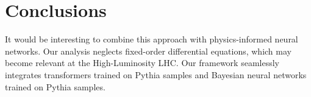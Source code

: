 \section{Conclusions}\label{sec:conclusions}

It would be interesting to combine this approach with physics-informed
neural networks. Our analysis neglects fixed-order differential
equations, which may become relevant at the High-Luminosity LHC. Our
framework seamlessly integrates transformers trained on Pythia samples
and Bayesian neural networks trained on Pythia samples.

